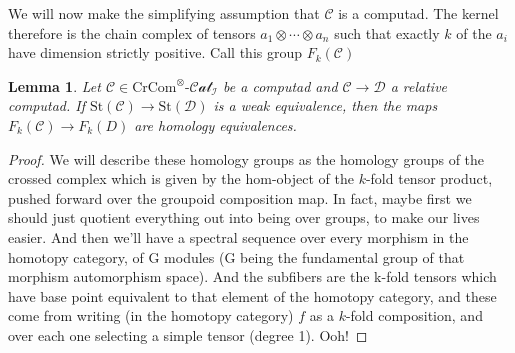 \documentclass[12pt]{article}
\newtheorem{lemma}[theorem]{Lemma}
\theoremstyle{definition}
\newcommand{\C}{\mathcal{C}}
\newcommand{\D}{\mathcal{D}}
\newcommand{\crcom}{\text{CrCom}}
\newcommand{\tensorcrossedcat}{\crcom^\otimes\text{-}\mathcal{Cat}}
\newcommand{\st}{\text{St}}
\begin{document}
	We will now make the simplifying assumption that $\C$ is a computad.
	The kernel therefore is the chain complex of tensors $a_1 \otimes \cdots \otimes a_n $ such that exactly $k$ of the $a_i$ have dimension strictly positive. Call this group $F_k(\C)$
	\begin{lemma}
		Let $\C \in \tensorcrossedcat_\mathcal{I}$ be a computad and $\C \to \D$ a relative computad. 
		If $\st(\C) \to \st(\D)$ is a weak equivalence, then the maps $F_k(\C) \to F_k(D)$ are homology equivalences.
	\end{lemma}
	\begin{proof}
		We will describe these homology groups as the homology groups of the crossed complex which is given by the hom-object of the $k$-fold tensor product, pushed forward over the groupoid composition map. In fact, maybe first we should just quotient everything out into being over groups, to make our lives easier. And then we'll have a spectral sequence over every morphism in the homotopy category, of G modules (G being the fundamental group of that morphism automorphism space). And the subfibers are the k-fold tensors which have base point equivalent to that element of the homotopy category, and these come from writing (in the homotopy category) $f$ as a $k$-fold composition, and over each one selecting a simple tensor (degree 1). Ooh!
	\end{proof}
	
\end{document}
